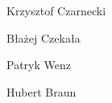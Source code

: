 \begin{center}
   \large
{Krzysztof Czarnecki

Błażej Czekała


Patryk Wenz

Hubert Braun} 
\end{center}